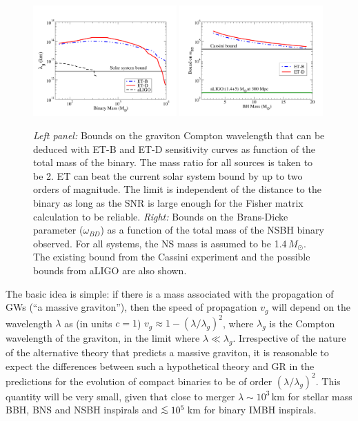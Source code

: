 \begin{figure}[t]
\centering
\includegraphics[width=0.49\textwidth]{./Sec_ET_ScienceCase/ET-BnD_MG_1Hz_Massratio2.pdf}
\includegraphics[width=0.49\textwidth]{./Sec_ET_ScienceCase/OmegaBD_1Hz_BH_Mass.pdf}
\caption{
\emph{Left panel:} Bounds on the graviton Compton wavelength that can be
deduced with ET-B and ET-D sensitivity curves as function of the 
total mass of the binary.  The mass ratio for all sources is taken to be 2.
ET can beat the current solar system bound by up to two orders of magnitude.
The limit is independent of the distance to the binary as long as the SNR is
large enough for the Fisher matrix calculation to be reliable. 
\emph{Right:} Bounds on the Brans-Dicke parameter ($\omega_{BD}$) as a function
of the total mass of the NSBH binary observed. For all systems, the NS mass 
is assumed to be 1.4\,$M_\odot.$  The existing bound from the Cassini 
experiment and the possible bounds from aLIGO are also shown.}
\label{fig:MassGravAll}
\end{figure}

The basic idea is simple: if there is a mass associated with the propagation 
of GWs (``a massive graviton''), then the speed of propagation $v_g$ will depend 
on the wavelength $\lambda$ as (in units $c=1$)
$v_g \approx 1 - (\lambda/\lambda_g)^2$, where 
$\lambda_g$ is the Compton wavelength of the graviton, in the limit where 
$\lambda \ll \lambda_g$.  Irrespective of the nature of the alternative 
theory that predicts a massive graviton, 
it is reasonable to expect the differences between such a hypothetical theory 
and GR in the predictions for the evolution of compact 
binaries to be of order $(\lambda/\lambda_g)^2$. This quantity will be very 
small, given that close to merger $\lambda \sim 10^3$\,km for stellar mass 
BBH, BNS and NSBH inspirals and $\lsim 10^5$\,km for binary IMBH inspirals.

